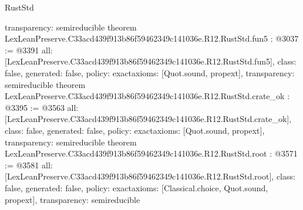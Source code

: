 \begin{lexlean}{RustStd}
\begin{coremodule}
{  transparency: semireducible
}
theorem LexLeanPreserve.C33acd439f913b86f59462349c141036e.R12.RustStd.fun5 : @3037 := @3391 {
  all: [LexLeanPreserve.C33acd439f913b86f59462349c141036e.R12.RustStd.fun5],
  class: false,
  generated: false,
  policy: exact{axioms: [Quot.sound, propext]},
  transparency: semireducible
}
theorem LexLeanPreserve.C33acd439f913b86f59462349c141036e.R12.RustStd.crate_ok : @3395 := @3563 {
  all: [LexLeanPreserve.C33acd439f913b86f59462349c141036e.R12.RustStd.crate_ok],
  class: false,
  generated: false,
  policy: exact{axioms: [Quot.sound, propext]},
  transparency: semireducible
}
theorem LexLeanPreserve.C33acd439f913b86f59462349c141036e.R12.RustStd.root : @3571 := @3581 {
  all: [LexLeanPreserve.C33acd439f913b86f59462349c141036e.R12.RustStd.root],
  class: false,
  generated: false,
  policy: exact{axioms: [Classical.choice, Quot.sound, propext]},
  transparency: semireducible
}


\end{coremodule}
\end{lexlean}
